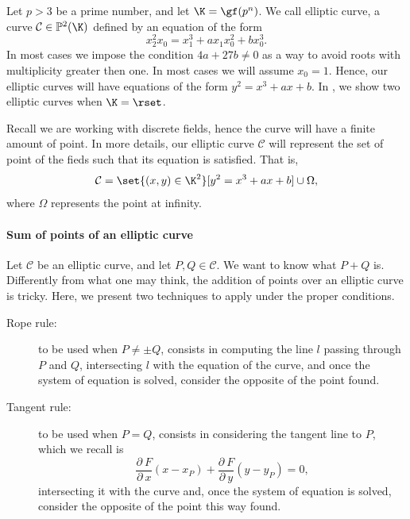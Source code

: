 \documentclass{subfiles}
\begin{document}
    Let \(p > 3\) be a prime number, and let \(\K = \gf(p^{n})\).
        We call elliptic curve, a curve \(\mathcal{C} \in \mathbb{P}^{2}(\K)\) defined by an equation of the form
        \[
            x_{2}^{2}x_{0} = x_{1}^{3} + a x_{1}x_{0}^{2} + bx_{0}^{3}.
        \]
        In most cases we impose the condition \(4a + 27b \ne 0\) 
        as a way to avoid roots with multiplicity greater then one.
        In most cases we will assume \(x_{0} = 1\).
        Hence, our elliptic curves will have equations of the form \(y^{2} = x^{3} + ax + b\).
        In , we show two elliptic curves when \(\K = \rset\).
        

    Recall we are working with discrete fields, hence the curve will have a finite amount of point.
        In more details, our elliptic curve \(\mathcal{C}\) will represent the set of point of 
        the fieds such that its equation is satisfied. That is,
        \[
            \mathcal{C} = \set{(x, y) \in \K^{2}}[y^{2} = x^{3} + ax + b] \cup \Omega,
        \]
        where \(\Omega\) represents the point at infinity.

    \paragraph{Sum of points of an elliptic curve}
    Let \(\mathcal{C}\) be an elliptic curve, and let \(P, Q \in \mathcal{C}\).
        We want to know what \(P + Q\) is.
        Differently from what one may think, the addition of points over an elliptic curve is tricky.
        Here, we present two techniques to apply under the proper conditions.
        \begin{description}
            \item [Rope rule:] to be used when \(P \ne \pm Q\),
                consists in computing the line \(l\) passing through \(P\) and \(Q\),
                intersecting \(l\) with the equation of the curve,
                and once the system of equation is solved, 
                consider the opposite of the point found\footnotemark.

            \item [Tangent rule:] to be used when \(P = Q\),
                consists in considering the tangent line to \(P\),
                which we recall is 
                \[
                    \frac{\partial \ F}{\partial \ x}(x - x_{P}) + \frac{\partial \ F }{\partial \ y}(y - y_{P}) = 0,
                \]
                intersecting it with the curve and,
                once the system of equation is solved,
                consider the opposite of the point this way found.
        \end{description}
\end{document}
